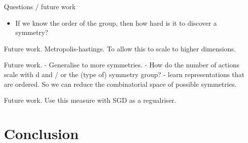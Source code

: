 

Questions / future work
\begin{itemize}
	\item If we know the order of the group, then how hard is it to discover a symmetry?
\end{itemize}

Future work.
Metropolis-hastings. To allow this to scale to higher dimensions.


Future work.
- Generalise to more symmetries.
- How do the number of actions scale with d and / or the (type of) symmetry group?
- learn representations that are ordered. So we can reduce the combinatorial space of possible symmetries.

Future work.
Use this measure with SGD as a regualriser.

\section{Conclusion}
